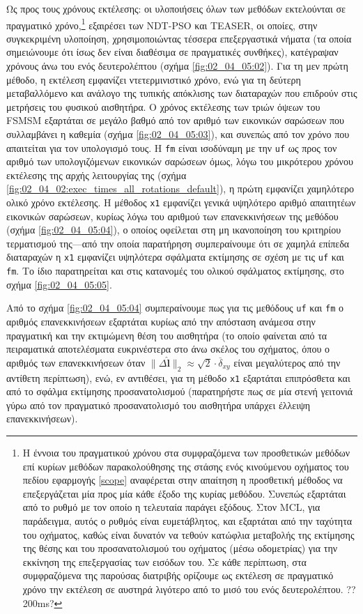 Ως προς τους χρόνους εκτέλεσης: οι υλοποιήσεις όλων των μεθόδων εκτελούνται σε
πραγματικό χρόνο,\footnote{Η έννοια του πραγματικού χρόνου στα συμφραζόμενα των
προσθετικών μεθόδων επί κυρίων μεθόδων παρακολούθησης της στάσης ενός
κινούμενου οχήματος του πεδίου εφαρμογής \ref{scope} αναφέρεται στην απαίτηση η
προσθετική μέθοδος να επεξεργάζεται μία προς μία κάθε έξοδο της κυρίας μεθόδου.
Συνεπώς εξαρτάται από το ρυθμό με τον οποίο η τελευταία παράγει εξόδους.  Στον
MCL, για παράδειγμα, αυτός ο ρυθμός είναι ευμετάβλητος, και εξαρτάται από την
ταχύτητα του οχήματος, καθώς είναι δυνατόν να τεθούν κατώφλια μεταβολής της
εκτίμησης της θέσης και του προσανατολισμού του οχήματος (μέσω οδομετρίας) για
την εκκίνηση της επεξεργασίας των εισόδων του. Σε κάθε περίπτωση, στα
συμφραζόμενα της παρούσας διατριβής ορίζουμε ως εκτέλεση σε πραγματικό χρόνο
την εκτέλεση σε αυστηρά λιγότερο από το μισό του ενός δευτερολέπτου. ?? 200ms?}
εξαιρέσει των NDT-PSO και TEASER, οι οποίες, στην συγκεκριμένη υλοποίηση,
χρησιμοποιώντας τέσσερα επεξεργαστικά νήματα (τα οποία σημειώνουμε ότι ίσως δεν
είναι διαθέσιμα σε πραγματικές συνθήκες), κατέγραψαν χρόνους άνω του ενός
δευτερολέπτου (σχήμα \ref{fig:02_04_05:02}). Για τη μεν πρώτη μέθοδο, η
εκτέλεση εμφανίζει ντετερμινιστικό χρόνο, ενώ για τη δεύτερη μεταβαλλόμενο και
ανάλογο της τυπικής απόκλισης των διαταραχών που επιδρούν στις μετρήσεις του
φυσικού αισθητήρα. Ο χρόνος εκτέλεσης των τριών όψεων του FSMSM εξαρτάται σε
μεγάλο βαθμό από τον αριθμό των εικονικών σαρώσεων που συλλαμβάνει η καθεμία
(σχήμα \ref{fig:02_04_05:03}), και συνεπώς από τον χρόνο που απαιτείται για τον
υπολογισμό τους. Η \texttt{fm} είναι ισοδύναμη με την \texttt{uf} ως προς τον
αριθμό των υπολογιζόμενων εικονικών σαρώσεων όμως, λόγω του μικρότερου χρόνου
εκτέλεσης της αρχής λειτουργίας της (σχήμα
\ref{fig:02_04_02:exec_times_all_rotations_default}), η πρώτη εμφανίζει
χαμηλότερο ολικό χρόνο εκτέλεσης. Η μέθοδος \texttt{x1} εμφανίζει γενικά
υψηλότερο αριθμό απαιτητέων εικονικών σαρώσεων, κυρίως λόγω του αριθμού των
επανεκκινήσεων της μεθόδου (σχήμα \ref{fig:02_04_05:04}), ο οποίος οφείλεται
στη μη ικανοποίηση του κριτηρίου τερματισμού της---από την οποία παρατήρηση
συμπεραίνουμε ότι σε χαμηλά επίπεδα διαταραχών η \texttt{x1} εμφανίζει
υψηλότερα σφάλματα εκτίμησης σε σχέση με τις \texttt{uf} και \texttt{fm}. Το
ίδιο παρατηρείται και στις κατανομές του ολικού σφάλματος εκτίμησης, στο σχήμα
\ref{fig:02_04_05:05}.

Από το σχήμα \ref{fig:02_04_05:04} συμπεραίνουμε πως για τις μεθόδους
\texttt{uf} και \texttt{fm} ο αριθμός επανεκκινήσεων εξαρτάται κυρίως από την
απόσταση ανάμεσα στην πραγματική και την εκτιμώμενη θέση του αισθητήρα (το
οποίο φαίνεται από τα πειραματικά αποτελέσματα ευκρινέστερα στο άνω σκέλος του
σχήματος, όπου ο αριθμός των επανεκκινήσεων όταν $\|\Delta \hat{\bm{l}}\|_2
\approx \sqrt{2}\cdot\overline{\delta}_{xy}$ είναι μεγαλύτερος από την αντίθετη
περίπτωση), ενώ, εν αντιθέσει, για τη μέθοδο \texttt{x1} εξαρτάται επιπρόσθετα
και από το σφάλμα εκτίμησης προσανατολισμού (παρατηρήστε πως σε μία στενή
γειτονιά γύρω από τον πραγματικό προσανατολισμό του αισθητήρα υπάρχει έλλειψη
επανεκκινήσεων).

